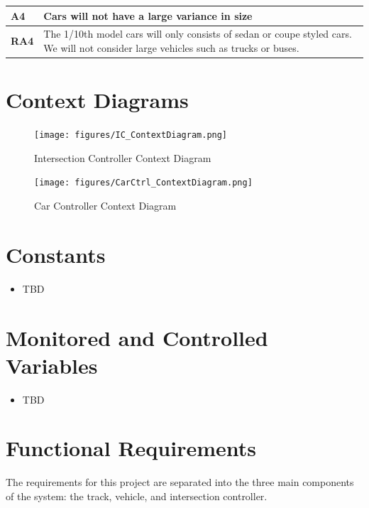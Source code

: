 \documentclass [11pt]{article}
\begin{document}
\begin{longtable}{| p{ } | p{ } | }\hline 
\textbf{A4} & \textbf{Cars will not have a large variance in size} \\ \hline
\textbf{RA4} &  The 1/10th model cars will only consists of sedan or coupe styled cars. We will not consider large vehicles such as trucks or buses.\\ \hline
\end{longtable}


\section{Context Diagrams}
\begin{figure} [h!]
	\centering
	\texttt{[image: figures/IC\_ContextDiagram.png]}
	\caption{Intersection Controller Context Diagram}
\end{figure}
\begin{figure} [h!]
	\centering
	\texttt{[image: figures/CarCtrl\_ContextDiagram.png]}
	\caption{Car Controller Context Diagram}
\end{figure}

\section{Constants}
\begin{itemize}
\item TBD

\end{itemize}


\section{Monitored and Controlled Variables}
\begin{itemize}
\item TBD

\end{itemize}


\section {Functional Requirements} 
The requirements for this project are separated into the three main components of the system: the track, vehicle, and intersection controller.
\end{document}
